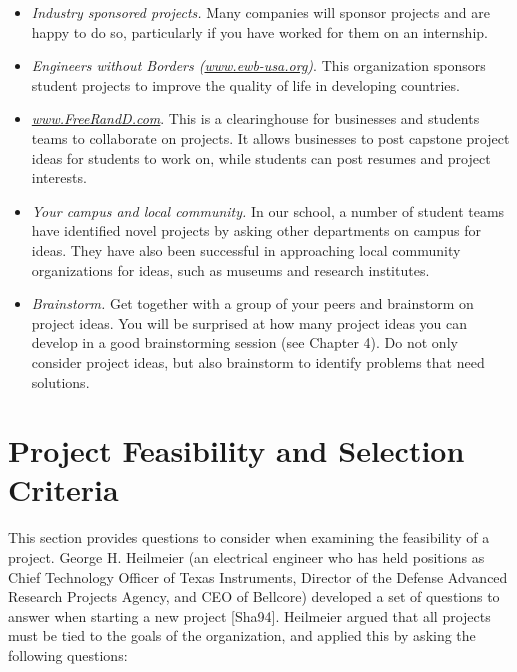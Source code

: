 \begin{itemize}
\item
  \emph{Industry sponsored projects.} Many companies will sponsor
  projects and are happy to do so, particularly if you have worked for
  them on an internship.
\item
  \emph{Engineers without Borders
  (\href{http://www.ewb-usa.org}{www.ewb-usa.org})}. This organization
  sponsors student projects to improve the quality of life in developing
  countries.
\item
  \href{http://www.FreeRandD.com}{\emph{www.FreeRandD.com}}. This is a
  clearinghouse for businesses and students teams to collaborate on
  projects. It allows businesses to post capstone project ideas for
  students to work on, while students can post resumes and project
  interests.
\item
  \emph{Your campus and local community.} In our school, a number of
  student teams have identified novel projects by asking other
  departments on campus for ideas. They have also been successful in
  approaching local community organizations for ideas, such as museums
  and research institutes.
\item
  \emph{Brainstorm.} Get together with a group of your peers and
  brainstorm on project ideas. You will be surprised at how many project
  ideas you can develop in a good brainstorming session (see Chapter 4).
  Do not only consider project ideas, but also brainstorm to identify
  problems that need solutions.
\end{itemize}

\section{Project Feasibility and Selection Criteria}
\label{section:project-feasibility-and-selection-criteria}

This section provides questions to consider when examining the
feasibility of a project. George H. Heilmeier (an electrical engineer
who has held positions as Chief Technology Officer of Texas Instruments,
Director of the Defense Advanced Research Projects Agency, and CEO of
Bellcore) developed a set of questions to answer when starting a new
project {[}Sha94{]}. Heilmeier argued that all projects must be tied to
the goals of the organization, and applied this by asking the following
questions:

